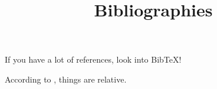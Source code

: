\documentclass{article}
\title{Bibliographies}
\begin{document}
\maketitle

If you have a lot of references, look into BibTeX!

According to \cite{Einstein}, things are relative.



\end{document}
